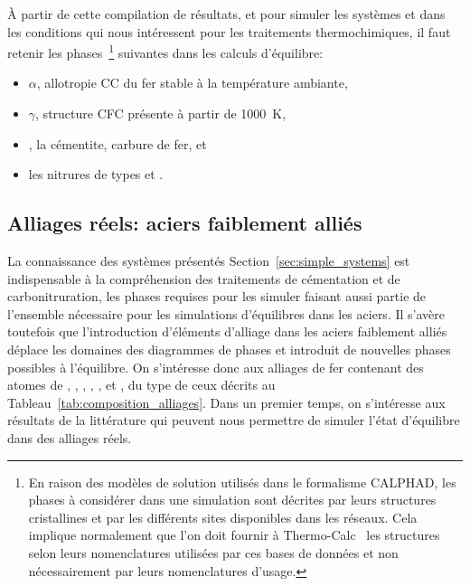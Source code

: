 À partir de cette compilation de résultats, et pour simuler les systèmes  et  dans les conditions qui nous intéressent pour les traitements thermochimiques, il faut retenir les phases~\footnote{En raison des modèles de solution utilisés dans le formalisme CALPHAD, les phases à considérer dans une simulation sont décrites par leurs structures cristallines et par les différents sites disponibles dans les réseaux. Cela implique normalement que l'on doit fournir à Thermo-Calc~\cite{Andersson2002,Borgenstam2000} les structures selon leurs nomenclatures utilisées par ces bases de données et non nécessairement par leurs nomenclatures d'usage.} suivantes dans les calculs d'équilibre:
\begin{itemize}
  \item $\alpha$, allotropie \og{}CC\fg{} du fer stable à la température ambiante,
  \item $\gamma$, structure \og{}CFC\fg{} présente à partir de \SI{1000}{\kelvin},
  \item {}, la cémentite, carbure de fer, et
  \item les nitrures de types  et .
\end{itemize}

\subsection{Alliages réels: aciers faiblement alliés}
\label{sec:low_alloy}

La connaissance des systèmes présentés Section~\ref{sec:simple_systems} est indispensable à la compréhension des traitements de cémentation et de carbonitruration, les phases requises pour les simuler faisant aussi partie de l'ensemble nécessaire pour les simulations d'équilibres dans les aciers. Il s'avère toutefois que l'introduction d'éléments d'alliage dans les aciers faiblement alliés déplace les domaines des diagrammes de phases et introduit de nouvelles phases possibles à l'équilibre. On s'intéresse donc aux alliages de fer contenant des atomes de , , , , ,  et , du type de ceux décrits au Tableau~\ref{tab:composition_alliages}. Dans un premier temps, on s'intéresse aux résultats de la littérature qui peuvent nous permettre de simuler l'état d'équilibre dans des alliages réels.
 
